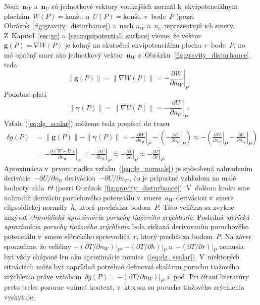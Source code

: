 \documentclass[a4paper, 12pt]{book}
\let\vec\mathbf
\begin{document}
Nech~$\vec n_W$ a~$\vec n_U$ sú jednotkové vektory vonkajších normál 
k~ekvipotenciálnym plochám~$W(P) = \textrm{konšt.}$ a~$U(P) = \textrm{konšt.}$ 
v~bode~$P$ (pozri Obrázok~\ref{fig:gravity_disturbance}) a~nech $n_W$ a~$n_U$ 
reprezentujú ich smery.  Z~Kapitol~\ref{sec:gg} 
a~\ref{sec:equipotential_surface} vieme, že vektor~$\vec g(P) = \nabla W(P)$ je 
kolmý na skutočnú ekvipotenciálnu plochu v~bode~$P$, no má opačný smer ako 
jednotkový vektor~$\vec n_W$ z~Obrázku~\ref{fig:gravity_disturbance}, teda
%
\begin{equation}
\| \vec g(P) \| = \| \nabla W(P) \| = -\left.\frac{\partial W}{\partial 
n_W}\right|_P.
\end{equation}
%
Podobne platí
%
\begin{equation}
\| \boldsymbol \gamma(P) \| = \| \nabla U(P) \| = -\left.\frac{\partial 
U}{\partial n_U}\right|_P.
\end{equation}
%
Vzťah~(\ref{eq:dg_scalar}) môžeme teda prepísať do tvaru
%
\begin{equation}
\label{eq:dg_normals}
\begin{split}
\delta g(P) &= \| \vec g(P) \| - \| \boldsymbol\gamma(P) \| 
= -\left.\frac{\partial W}{\partial n_W}\right|_P - \left( 
- \left.\frac{\partial U}{\partial n_U}\right|_P\right) \approx -\left( 
\left.\frac{\partial W}{\partial n_W}\right|_P - \left.\frac{\partial 
U}{\partial n_W}\right|_P\right)\\
%
&= -\left.\frac{\partial (W - U)}{\partial n_W}\right|_P 
=  -\left.\frac{\partial T}{\partial n_W}\right|_P \approx 
-\left.\frac{\partial T}{\partial h}\right|_P \approx -\left.\frac{\partial 
T}{\partial r}\right|_P{.}
\end{split}
\end{equation}
%
Aproximácia v~prvom riadku vzťahu~(\ref{eq:dg_normals}) je spôsobená nahradením 
derivácie~$-\partial U \slash \partial n_U$ deriváciou~$-\partial U \slash 
\partial n_W$, čo je prípustné vzhľadom na malé hodnoty uhla~$\Theta$ (pozri 
Obrázok~\ref{fig:gravity_disturbance}).  V~ďalšom kroku sme nahradili deriváciu 
poruchového potenciálu v~smere~$n_W$ deriváciou v~smere elipsoidickej 
normály~$h$, ktorá prechádza bodom~$P$.  Táto veličina sa zvykne nazývať 
\emph{elipsoidická aproximácia poruchy tiažového zrýchlenia}.  Posledná 
\emph{sférická aproximácia poruchy tiažového zrýchlenia} bola získaná 
derivovaním poruchového potenciálu v~smere sférického sprievodiča~$r$, ktorý 
prechádza bodom~$P$.  Na záver spomeňme, že veličiny $-\left(\partial T \slash 
\partial n_W\right)|_P$, $-\left(\partial T \slash \partial h\right)|_P$ 
a~$-\left(\partial T \slash \partial r\right)|_P$ nemusia byť vždy chápané len 
ako aproximácie rovnice~(\ref{eq:dg_scalar}).  V~niektorých situáciách môže byť 
napríklad potrebné definovať skalárnu poruchu tiažového zrýchlenia práve 
vzťahom~$\delta g(P) = -\left(\partial T \slash \partial n_W\right)|_P$ a~pod.  
Pri čítaní literatúry preto treba pozorne vnímať kontext, v~ktorom sa porucha 
tiažového zrýchlenia vyskytuje.
\end{document}
